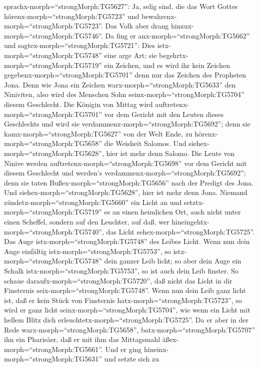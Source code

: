 sprachx-morph=``strongMorph:TG5627'': Ja, selig sind, die das Wort
Gottes hörenx-morph=``strongMorph:TG5723'' und
bewahrenx-morph=``strongMorph:TG5723''.  Das Volk aber
drang hinzux-morph=``strongMorph:TG5746''. Da fing er
anx-morph=``strongMorph:TG5662'' und
sagtex-morph=``strongMorph:TG5721'': Dies
istx-morph=``strongMorph:TG5748'' eine arge Art; sie
begehrtx-morph=``strongMorph:TG5719'' ein Zeichen, und es wird ihr kein
Zeichen gegebenx-morph=``strongMorph:TG5701'' denn nur das Zeichen des
Propheten Jona.  Denn wie Jona ein Zeichen
warx-morph=``strongMorph:TG5633'' den Niniviten, also wird des Menschen
Sohn seinx-morph=``strongMorph:TG5704'' diesem Geschlecht. 
Die Königin von Mittag wird auftretenx-morph=``strongMorph:TG5701'' vor
dem Gericht mit den Leuten dieses Geschlechts und wird sie
verdammenx-morph=``strongMorph:TG5692''; denn sie
kamx-morph=``strongMorph:TG5627'' von der Welt Ende, zu
hörenx-morph=``strongMorph:TG5658'' die Weisheit Salomos. Und
siehex-morph=``strongMorph:TG5628'', hier ist mehr denn Salomo.
 Die Leute von Ninive werden
auftretenx-morph=``strongMorph:TG5698'' vor dem Gericht mit diesem
Geschlecht und werden's verdammenx-morph=``strongMorph:TG5692''; denn
sie taten Bußex-morph=``strongMorph:TG5656'' nach der Predigt des Jona.
Und siehex-morph=``strongMorph:TG5628'', hier ist mehr denn Jona.
 Niemand zündetx-morph=``strongMorph:TG5660'' ein Licht an
und setztx-morph=``strongMorph:TG5719'' es an einen heimlichen Ort, auch
nicht unter einen Scheffel, sondern auf den Leuchter, auf daß, wer
hineingehtx-morph=``strongMorph:TG5740'', das Licht
sehex-morph=``strongMorph:TG5725''.  Das Auge
istx-morph=``strongMorph:TG5748'' des Leibes Licht. Wenn nun dein Auge
einfältig istx-morph=``strongMorph:TG5753'', so
istx-morph=``strongMorph:TG5748'' dein ganzer Leib licht; so aber dein
Auge ein Schalk istx-morph=``strongMorph:TG5753'', so ist auch dein Leib
finster.  So schaue daraufx-morph=``strongMorph:TG5720'',
daß nicht das Licht in dir Finsternis seix-morph=``strongMorph:TG5748''.
 Wenn nun dein Leib ganz licht ist, daß er kein Stück von
Finsternis hatx-morph=``strongMorph:TG5723'', so wird er ganz licht
seinx-morph=``strongMorph:TG5704'', wie wenn ein Licht mit hellem Blitz
dich erleuchtetx-morph=``strongMorph:TG5725''.  Da er aber
in der Rede warx-morph=``strongMorph:TG5658'',
batx-morph=``strongMorph:TG5707'' ihn ein Pharisäer, daß er mit ihm das
Mittagsmahl äßex-morph=``strongMorph:TG5661''. Und er ging
hineinx-morph=``strongMorph:TG5631'' und setzte sich zu
